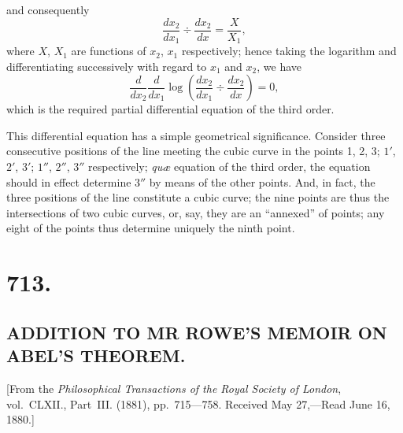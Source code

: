 \documentclass[12pt,a4paper,oneside]{book}
\theoremstyle{plain}
\theoremstyle{definition}
\theoremstyle{remark}
\begin{document}
\newpage
and consequently
\[
\frac{dx_2}{dx_1}\div\frac{dx_2}{dx}=\frac{X}{X_1},
\]
where $X$, $X_1$ are functions of $x_2$, $x_1$ respectively; hence taking the logarithm and differentiating successively with regard to $x_1$ and $x_2$, we have
\[
\frac{d}{dx_2}\frac{d}{dx_1}\log\left(\frac{dx_2}{dx_1}\div\frac{dx_2}{dx}\right)=0,
\]
which is the required partial differential equation of the third order.

This differential equation has a simple geometrical significance. Consider three consecutive positions of the line meeting the cubic curve in the points 1, 2, 3; $1'$, $2'$, $3'$; $1''$, $2''$, $3''$ respectively; \textit{qu\ae{}} equation of the third order, the equation should in effect determine $3''$ by means of the other points. And, in fact, the three positions of the line constitute a cubic curve; the nine points are thus the intersections of two cubic curves, or, say, they are an ``annexed'' of points; any eight of the points thus determine uniquely the ninth point.

\vspace{2em}
\noindent\dotfill

\section*{713.}
\subsection*{ADDITION TO MR ROWE'S MEMOIR ON ABEL'S THEOREM.}

\begin{center}
\small [From the \textit{Philosophical Transactions of the Royal Society of London}, vol.~CLXII., Part~III. (1881), pp.~715---758. Received May 27,---Read June 16, 1880.]
\end{center}

\medskip
\end{document}
